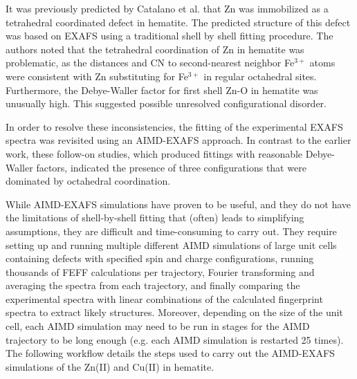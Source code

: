 \documentclass[runningheads,a4paper]{llncs}
\begin{document}
It was previously predicted by Catalano et al. that Zn was immobilized as a tetrahedral coordinated defect in hematite. The predicted structure of this defect was based on EXAFS using a traditional shell by shell fitting procedure.  The authors noted that the tetrahedral coordination of Zn in hematite was problematic, as the distances and CN to second-nearest neighbor Fe$^{3+}$ atoms were consistent with Zn substituting for Fe$^{3+}$ in regular octahedral sites.  Furthermore, the
Debye-Waller factor for first shell Zn-O in hematite was unusually  high.  This suggested possible unresolved configurational disorder. 

In order to resolve these inconsistencies, the fitting of the experimental EXAFS spectra was revisited using an AIMD-EXAFS approach.  In contrast to the earlier work, these follow-on studies, which produced fittings with reasonable Debye-Waller factors, indicated the presence of three configurations that were dominated by octahedral coordination.

While AIMD-EXAFS simulations have proven to be useful, and they do not have the limitations of shell-by-shell fitting that (often) leads to simplifying assumptions, they are difficult and time-consuming to carry out. They require setting up and running multiple different AIMD simulations of large unit cells containing defects with specified spin and charge configurations, running thousands of FEFF calculations per trajectory, Fourier transforming and averaging the spectra from each trajectory, and finally comparing the experimental spectra with linear combinations of the calculated fingerprint spectra to extract likely structures.  Moreover, depending on the size of the unit cell, each AIMD simulation may need to be run in stages for the AIMD trajectory to be long enough (e.g. each AIMD simulation is restarted 25 times). The following workflow details the steps used to carry out the AIMD-EXAFS simulations of the Zn(II) and Cu(II) in hematite.
\newline
\end{document}

